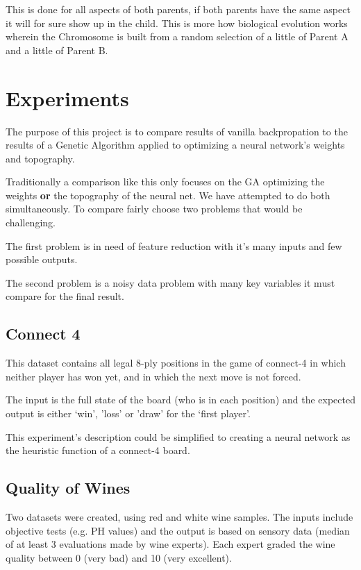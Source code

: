 \documentclass[journal]{IEEEtran}
\begin{document}
    This is done for all aspects of both parents, if both parents have the same aspect it will
    for sure show up in the child. This is more how biological evolution works wherein the
    Chromosome is built from a random selection of a little of Parent A and a little of Parent B.

\section{Experiments}
  The purpose of this project is to compare results of vanilla backpropation to the results of
  a Genetic Algorithm applied to optimizing a neural network's weights and topography.

  Traditionally a comparison like this only focuses on the GA optimizing the weights \textbf{or}
  the topography of the neural net. We have attempted to do both simultaneously. To compare fairly
  choose two problems that would be challenging.

  The first problem is in need of feature reduction with it's many inputs and few possible outputs.

  The second problem is a noisy data problem with many key variables it must compare for the final
  result.

  \subsection{Connect 4}
   This dataset contains all legal 8-ply positions in the game of
   connect-4 in which neither player has won yet, and in which the next
   move is not forced.

   The input is the full state of the board (who is in each position) and the expected output
   is either `win', 'loss' or 'draw' for the `first player'.

   This experiment's description could be simplified to creating a neural network as the heuristic
   function of a connect-4 board.

  \subsection{Quality of Wines}
  Two datasets were created, using red and white wine samples.
  The inputs include objective tests (e.g. PH values) and the output is based on sensory data
  (median of at least 3 evaluations made by wine experts). Each expert graded the wine quality
  between 0 (very bad) and 10 (very excellent).
\end{document}
